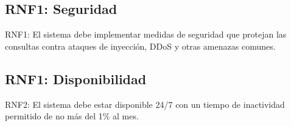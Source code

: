 \subsection{RNF1: Seguridad}

RNF1: El sistema debe implementar medidas de seguridad que protejan las consultas contra ataques de inyección, DDoS y otras amenazas comunes.

\subsection{RNF1: Disponibilidad}

RNF2: El sistema debe estar disponible 24/7 con un tiempo de inactividad permitido de no más del 1\% al mes.